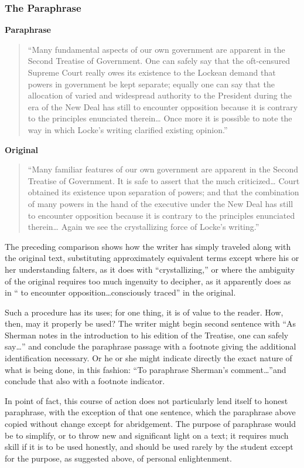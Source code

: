 \subsubsection{The Paraphrase}

\textbf{Paraphrase}
\begin{quote}
“Many fundamental aspects of our own government are apparent in the Second Treatise of Government. One can safely say that the oft-censured Supreme Court really owes its existence to the Lockean demand that powers in government be kept separate; equally one can say that the allocation of varied and widespread authority to the President during the era of the New Deal has still to encounter opposition because it is contrary to the principles enunciated therein… Once more it is possible to note the way in which Locke’s writing clarified existing opinion.”
\end{quote}

\textbf{Original}
\begin{quote}
“Many familiar features of our own government are apparent in the Second Treatise of Government. It is safe to assert that the much criticized… Court obtained its existence upon separation of powers; and that the combination of many powers in the hand of the executive under the New Deal has still to encounter opposition because it is contrary to the principles enunciated therein… Again we see the crystallizing force of Locke’s writing.”
\end{quote}

The preceding comparison shows how the writer has simply traveled along with the original text, substituting approximately equivalent terms except where his or her understanding falters, as it does with “crystallizing,” or where the ambiguity of the original requires too much ingenuity to decipher, as it apparently does as in “ to encounter opposition…consciously traced” in the original.

Such a procedure has its uses; for one thing, it is of value to the reader. How, then, may it properly be used? The writer might begin second sentence with “As Sherman notes in the introduction to his edition of the Treatise, one can safely say…” and conclude the paraphrase passage with a footnote giving the additional identification necessary. Or he or she might indicate directly the exact nature of what is being done, in this fashion: “To paraphrase Sherman’s comment…”and conclude that also with a footnote indicator.

In point of fact, this course of action does not particularly lend itself to honest paraphrase, with the exception of that one sentence, which the paraphrase above copied without change except for abridgement. The purpose of paraphrase would be to simplify, or to throw new and significant light on a text; it requires much skill if it is to be used honestly, and should be used rarely by the student except for the purpose, as suggested above, of personal enlightenment.

